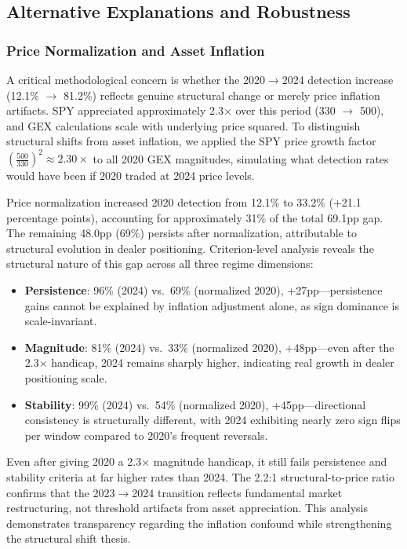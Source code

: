 \subsection{Alternative Explanations and Robustness}

\subsubsection{Price Normalization and Asset Inflation}

A critical methodological concern is whether the 2020$\rightarrow$2024 detection increase (12.1\% $\rightarrow$ 81.2\%) reflects genuine structural change or merely price inflation artifacts. SPY appreciated approximately 2.3$\times$ over this period (330 $\rightarrow$ 500), and GEX calculations scale with underlying price squared. To distinguish structural shifts from asset inflation, we applied the SPY price growth factor $\left(\frac{500}{330}\right)^2 \approx 2.30\times$ to all 2020 GEX magnitudes, simulating what detection rates would have been if 2020 traded at 2024 price levels.

Price normalization increased 2020 detection from 12.1\% to 33.2\% (+21.1 percentage points), accounting for approximately 31\% of the total 69.1pp gap. The remaining 48.0pp (69\%) persists after normalization, attributable to structural evolution in dealer positioning. Criterion-level analysis reveals the structural nature of this gap across all three regime dimensions:

\begin{itemize}
    \item \textbf{Persistence}: 96\% (2024) vs.\ 69\% (normalized 2020), +27pp---persistence gains cannot be explained by inflation adjustment alone, as sign dominance is scale-invariant.
    \item \textbf{Magnitude}: 81\% (2024) vs.\ 33\% (normalized 2020), +48pp---even after the 2.3$\times$ handicap, 2024 remains sharply higher, indicating real growth in dealer positioning scale.
    \item \textbf{Stability}: 99\% (2024) vs.\ 54\% (normalized 2020), +45pp---directional consistency is structurally different, with 2024 exhibiting nearly zero sign flips per window compared to 2020's frequent reversals.
\end{itemize}

Even after giving 2020 a 2.3$\times$ magnitude handicap, it still fails persistence and stability criteria at far higher rates than 2024. The 2.2:1 structural-to-price ratio confirms that the 2023$\rightarrow$2024 transition reflects fundamental market restructuring, not threshold artifacts from asset appreciation. This analysis demonstrates transparency regarding the inflation confound while strengthening the structural shift thesis.


